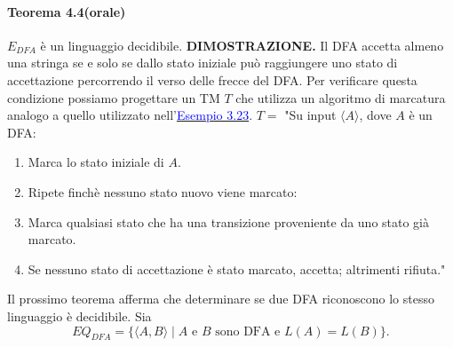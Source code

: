 \documentclass{article}
\begin{document}
\paragraph{Teorema 4.4(orale)}
\label{teorema-4.4}
$E_{DFA}$ è un linguaggio decidibile.
\vspace{1em}
\text{}
\newline
\hbox{\textbf{DIMOSTRAZIONE.}}
Il DFA accetta almeno una stringa se e solo se dallo stato iniziale può raggiungere uno stato di accettazione percorrendo il verso delle frecce del DFA.
Per verificare questa condizione possiamo progettare un TM $T$ che utilizza un algoritmo di marcatura analogo a quello utilizzato nell'\hyperref[fig:example_image1]{\textcolor{blue}{Esempio 3.23}}.
\vspace{1em}
\text{}
\newline
$T = $ "Su input $\langle A \rangle$, dove $A$ è un DFA:
\begin{enumerate}
    \item Marca lo stato iniziale di $A$.
    \item Ripete finchè nessuno stato nuovo viene marcato:
    \item Marca qualsiasi stato che ha una transizione proveniente da uno stato già marcato.
    \item Se nessuno stato di accettazione è stato marcato, accetta; altrimenti rifiuta."
\end{enumerate}
\vspace{1em}

Il prossimo teorema afferma che determinare se due DFA riconoscono lo stesso linguaggio è decidibile. Sia
$$
EQ_{DFA} = \{\langle A,B \rangle \mid A \text{ e } B \text{ sono DFA e } L(A) = L(B) \}.
$$
\end{document}
